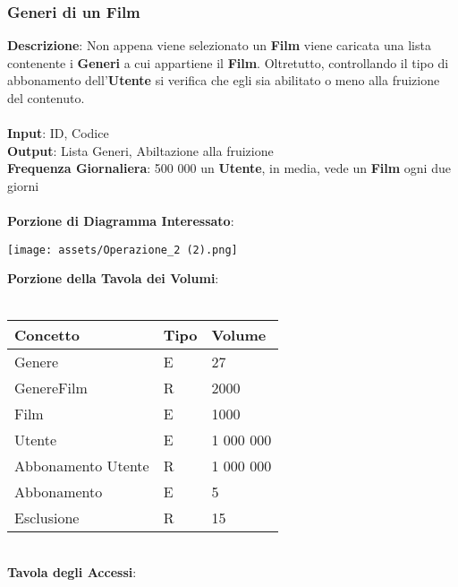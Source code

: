 \documentclass{article}
\begin{document}
\subsubsection{Generi di un Film}
\textbf{Descrizione}: Non appena viene selezionato un \textbf{Film} viene caricata una lista contenente i \textbf{Generi} a cui appartiene il \textbf{Film}. Oltretutto, controllando il tipo di abbonamento dell'\textbf{Utente} si verifica che egli sia abilitato o meno alla fruizione del contenuto.\\ \\ 
\textbf{Input}: ID, Codice \\ 
\textbf{Output}: Lista Generi, Abiltazione alla fruizione \\ 
\textbf{Frequenza Giornaliera}: 500 000 un \textbf{Utente}, in media, vede un \textbf{Film} ogni due giorni \\ \\
\textbf{Porzione di Diagramma Interessato}:
\begin{center}
\centering
\texttt{[image: assets/Operazione\_2 (2).png]}
\end{center} 
%
%
%
%
%
%
%
%
\textbf{Porzione della Tavola dei Volumi}: \\ \\
\begin{tabular}{|C{2.6cm}|C{2.6cm}|C{2.6cm}|}
\hline
    \textbf{Concetto} & \textbf{Tipo} & \textbf{Volume} \\
\hline
Genere & E & 27 \\
\hline
GenereFilm & R & 2000 \\ 
\hline
Film & E & 1000 \\
\hline
Utente & E & 1 000 000 \\
\hline
Abbonamento Utente & R & 1 000 000 \\
\hline
Abbonamento & E & 5 \\
\hline
Esclusione & R & 15 \\
\hline
\end{tabular} \\
\textbf{Tavola degli Accessi}: \\ \\
\end{document}
